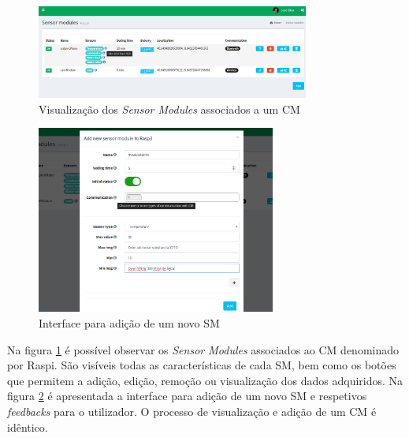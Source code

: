 \newpage



\begin{figure}[h]
	\centering

		\includegraphics[width=0.8\textwidth]{prints-web/sm_show.png}
		\caption{Visualização dos \textit{Sensor Modules} associados a um \acl{CM} }
		\label{view-sm}

\end{figure}


\begin{figure}[h]
		\centering
		\includegraphics[width=0.7\textwidth]{prints-web/sm_add.png}
		\caption{Interface para adição de um novo \acl{SM} }
		\label{add-sm}

\end{figure}



Na figura \ref{view-sm} é possível observar os \textit{Sensor Modules} associados ao \acl{CM} denominado por Raspi. São visíveis todas as características de cada \acl{SM}, bem como os botões que permitem a adição, edição, remoção ou visualização dos dados adquiridos. Na figura \ref{add-sm} é apresentada a interface para adição de um novo \acl{SM} e respetivos \textit{feedbacks} para o utilizador. O processo de visualização e adição de um \acl{CM} é idêntico. 


\newpage



